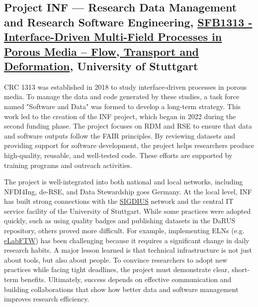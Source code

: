 \documentclass{eceasst}
\begin{document}
\subsection{Project INF --- Research Data Management and Research Software Engineering, \href{https://gepris.dfg.de/gepris/projekt/327154368}{SFB1313 - Interface-Driven Multi-Field Processes in Porous Media – Flow, Transport and Deformation}, University of Stuttgart}
CRC 1313 was established in 2018 to study interface-driven processes in porous media.
To manage the data and code generated by these studies, a task force named "Software and Data" was formed to develop a long-term strategy. This work led to the creation of the INF project, which began in 2022 during the second funding phase. The project focuses on RDM and RSE to ensure that data and software outputs follow the FAIR principles. By reviewing datasets and providing support for software development, the project helps researchers produce high-quality, reusable, and well-tested code. These efforts are supported by training programs and outreach activities.

The project is well-integrated into both national and local networks, including NFDI4Ing, de-RSE, and Data Stewardship goes Germany.
At the local level, INF has built strong connections with the \href{https://www.simtech.uni-stuttgart.de/communication/events/workshops/sigdius-seminars/}{SIGDIUS} network and the central IT service facility of the University of Stuttgart. While some practices were adopted quickly, such as using quality badges and publishing datasets in the DaRUS repository, others proved more difficult. For example, implementing ELNs (e.g. \href{https://www.elabftw.net/}{eLabFTW}) has been challenging because it requires a significant change in daily research habits. A major lesson learned is that technical infrastructure is not just about tools, but also about people. To convince researchers to adopt new practices while facing tight deadlines, the project must demonstrate clear, short-term benefits. Ultimately, success depends on effective communication and building collaborations that show how better data and software management improves research efficiency.
\end{document}
